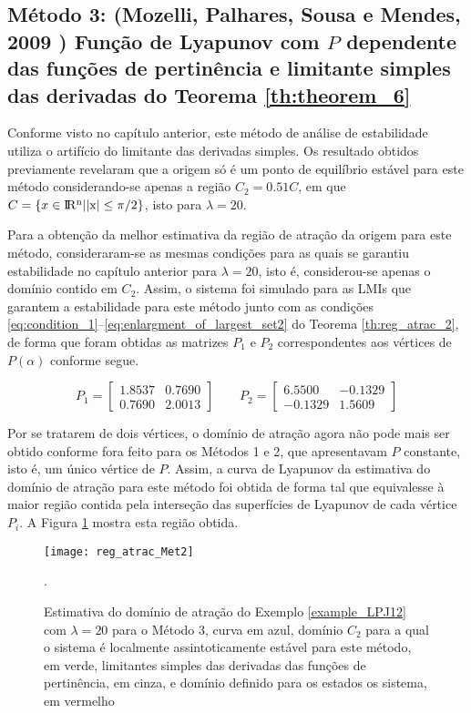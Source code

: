 \subsection{Método 3: (Mozelli, Palhares, Sousa e Mendes, 2009 \cite{MPSM:2009}) Função de  Lyapunov com $P$ dependente das funções de pertinência e limitante simples das derivadas do Teorema \ref{th:theorem_6}}

Conforme visto no capítulo anterior, este método de análise de estabilidade utiliza o artifício do limitante das derivadas simples. Os resultado obtidos previamente revelaram que a origem só é um ponto de equilíbrio estável para este método considerando-se apenas a região $C_2 = 0.51C$, em que $C = \{x \in \rm I\!R^n | |x| \leq \pi/2\}$, isto para $\lambda = 20$.

Para a obtenção da melhor estimativa da região de atração da origem para este método, consideraram-se as mesmas condições para as quais se garantiu estabilidade no capítulo anterior para $\lambda = 20$, isto é, considerou-se apenas o domínio contido em $C_2$. Assim, o sistema foi simulado para as LMIs que garantem a estabilidade para este método junto com as condições \ref{eq:condition_1}--\ref{eq:enlargment_of_largest_set2} do Teorema \ref{th:reg_atrac_2}, de forma que foram obtidas as matrizes $P_1$ e $P_2$ correspondentes aos vértices de $P(\alpha)$ conforme segue.

\begin{equation*}
P_1 =\begin{bmatrix}1.8537&0.7690\\0.7690&2.0013\end{bmatrix}\qquad P_2 = \begin{bmatrix}6.5500&-0.1329\\-0.1329&1.5609\end{bmatrix}
\end{equation*}

Por se tratarem de dois vértices, o domínio de atração agora não pode mais ser obtido conforme fora feito para os Métodos 1 e 2, que apresentavam $P$ constante, isto é, um único vértice de $P$. Assim, a curva de Lyapunov da estimativa do domínio de atração para este método foi obtida de forma tal que equivalesse à maior região contida pela interseção das superfícies de Lyapunov de cada vértice $P_i$. A Figura \ref{fig:reg_atrac_Met2} mostra esta região obtida.

\begin{figure}[htbp]
	\centering
	\texttt{[image: reg\_atrac\_Met2]}
	\caption{Estimativa do domínio de atração do Exemplo \ref{example_LPJ12} com $\lambda = 20$ para o Método 3, curva em azul, domínio $C_2$ para a qual o sistema é localmente assintoticamente estável para este método, em verde, limitantes simples das derivadas das funções de pertinência, em cinza, e domínio definido para os estados os sistema, em vermelho}.
	\label{fig:reg_atrac_Met2}
\end{figure}

